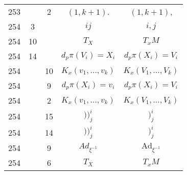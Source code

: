 \documentclass[a4paper,11pt]{article}
\newcommand{\mr}{\mathrm}
\newcommand{\ld}{\ldots}
\newcommand{\Ad}{\mr{Ad}}
\begin{document}
\begin{center}
\begin{tabular}{|c|c|c|c|c|}
    253 & & 2 & $( 1, k + 1 )$. & $( 1, k + 1 )$, \\
    254 & 3 & & $ij$ & $i, j$ \\
    254 & 10 & & $T_{ X }$ & $T_{ x }M$ \\
    254 & 14 & & $d_{ p }\pi( V_{ i } ) = X_{ i }$ & $d_{ p }\pi( X_{ i } )
                                                     = V_{ i }$ \\
    254 & & 10 & $K_{ x }( v_{ 1 }, \ld, v_{ k } )$ & $K_{ x }( V_{ 1 },
                                                      \ld, V_{ k } )$ \\
    254 & & 9 & $d_{ p }\pi( X_{ i } ) = v_{ i }$ & $d_{ p }\pi( X_{ i } )
                                                    = V_{ i }$ \\
    254 & & 2 & $K_{ x }( v_{ 1 }, \ld, v_{ k } )$ & $K_{ x }( V_{ 1 },
                                                     \ld, V_{ k } )$ \\
    254 & & 15 & $) )^{ i }_{ j }$ & $)^{ i }_{ j }$ \\
    254 & & 14 & $) )^{ i }_{ j }$ & $)^{ i }_{ j }$ \\
    254 & & 9 & $Ad_{ \xi^{ -1 } }$ & $\Ad_{ \xi^{ -1 } }$ \\
    254 & & 6 & $T_{ X }$ & $T_{ x }M$ \\ \hline
  \end{tabular}


\end{center}
\end{document}
